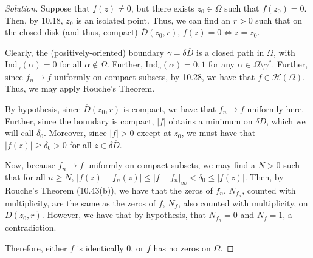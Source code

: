 \documentclass[10pt]{article}
\begin{document}
\begin{proof}[Solution]

Suppose that $f(z) \not = 0$, but there exists $z_0 \in \Omega$ such that $f(z_0) = 0$. Then, by 10.18, $z_0$ is an isolated point. Thus, we can find an $r > 0$ such that on the closed disk (and thus, compact) $\overline{D}(z_0,r)$, $f(z) = 0 \iff z = z_0$.

Clearly, the (positively-oriented) boundary $\gamma = \delta\overline{D}$ is a closed path in $\Omega$, with $\text{Ind}_{\gamma}(\alpha) = 0$ for all $\alpha \not \in \Omega$. Further, $\text{Ind}_{\gamma}(\alpha) = 0,1$ for any $\alpha \in \Omega \setminus \gamma^*$. Further, since $f_n \to f$ uniformly on compact subsets, by 10.28, we have that $f \in \mathcal{H}(\Omega)$. Thus, we may apply Rouche's Theorem.

By hypothesis, since $\overline{D}(z_0,r)$ is compact, we have that $f_n \to f$ uniformly here. Further, since the boundary is compact, $|f|$ obtains a minimum on $\delta \overline{D}$, which we will call $\delta_0$. Moreover, since $|f| > 0$ except at $z_0$, we must have that $|f(z)| \geq \delta_0 > 0$ for all $z \in \delta \overline{D}$.

Now, because $f_n \to f$ uniformly on compact subsets, we may find a $N > 0$ such that for all $n \geq N$, $|f(z) - f_n(z)| \leq | f - f_n |_\infty < \delta_0 \leq |f(z)|$. Then, by Rouche's Theorem (10.43(b)), we have that the zeros of $f_n$, $N_{f_n}$, counted with multiplicity, are the same as the zeros of $f$, $N_f$, also counted with multiplicity, on $D(z_0,r)$. However, we have that by hypothesis, that $N_{f_n} = 0$ and $N_f = 1$, a contradiction.

Therefore, either $f$ is identically 0, or $f$ has no zeros on $\Omega$.

\end{proof}
\end{document}
